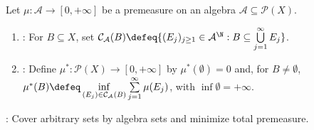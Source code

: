 \begin{definition} \label{def:outer-measure-generated-by-premeasure} \\
Let $\mu:\mathcal{A}\to[0,+\infty]$ be a premeasure on an algebra $\mathcal{A}\subseteq\mathcal{P}(X)$.
\begin{enumerate}[label=(\roman*)]
\setlength{\itemsep}{0pt}
\item {}: For $B\subseteq X$, set $\mathcal{C}_{\mathcal{A}}(B)\defeq\{(E_j)_{j\geq1}\in\mathcal{A}^{\N}:B\subseteq\bigcup\limits_{j=1}^{\infty}E_j\}$.
\item {}: Define $\mu^\ast:\mathcal{P}(X)\to[0,+\infty]$ by $\mu^\ast(\emptyset)=0$ and, for $B\neq\emptyset$, $\mu^\ast(B)\defeq\inf\limits_{(E_j)\in\mathcal{C}_{\mathcal{A}}(B)}\sum\limits_{j=1}^{\infty}\mu(E_j)$, with $\inf\emptyset=+\infty$.
\end{enumerate}
: Cover arbitrary sets by algebra sets and minimize total premeasure.
\end{definition}

